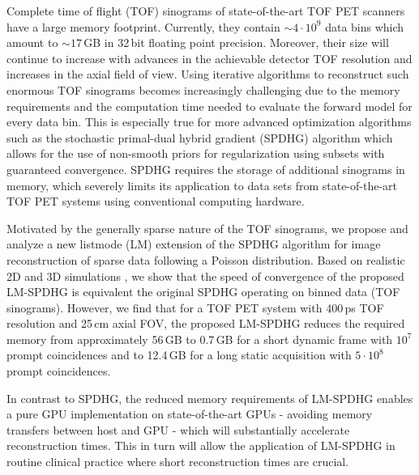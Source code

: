 Complete time of flight (TOF) sinograms of state-of-the-art TOF PET scanners have a large memory 
footprint.
Currently, they contain ${\sim}4{\cdot}10^9$ data bins which amount to ${\sim}17$\,GB 
in 32\,bit floating point precision.
Moreover, their size will continue to increase with advances in the 
achievable detector TOF resolution and increases in the axial field of view.
Using iterative algorithms to reconstruct such enormous TOF sinograms becomes increasingly
challenging due to the memory requirements and the computation time needed to evaluate the
forward model for every data bin.
This is especially true for more advanced optimization algorithms such as the
stochastic primal-dual hybrid gradient (SPDHG) algorithm which allows for the use of non-smooth priors
for regularization using subsets with guaranteed convergence.
SPDHG requires the storage of additional sinograms in memory, which severely limits
its application to data sets from state-of-the-art TOF PET systems using conventional
computing hardware.

Motivated by the generally sparse nature of the TOF sinograms, we propose and analyze a new 
listmode (LM) extension of the SPDHG algorithm  for image reconstruction of sparse data 
following a Poisson distribution.
Based on realistic 2D and 3D simulations , we show that the speed of convergence of the proposed 
LM-SPDHG is equivalent the original SPDHG operating on binned data (TOF sinograms).
However, we find that for a TOF PET system with 400\,ps TOF resolution and 25\,cm axial FOV,
the proposed LM-SPDHG reduces the required memory from approximately 56\,GB to
0.7\,GB for a short dynamic frame with $10^7$ prompt coincidences and to 12.4\,GB for a long 
static acquisition with $5\cdot10^8$ prompt coincidences.

In contrast to SPDHG, the reduced memory requirements of LM-SPDHG enables 
a pure GPU implementation on state-of-the-art GPUs - avoiding memory transfers
between host and GPU - which will substantially accelerate reconstruction times.
This in turn will allow the application of LM-SPDHG in routine clinical practice where short
reconstruction times are crucial.
